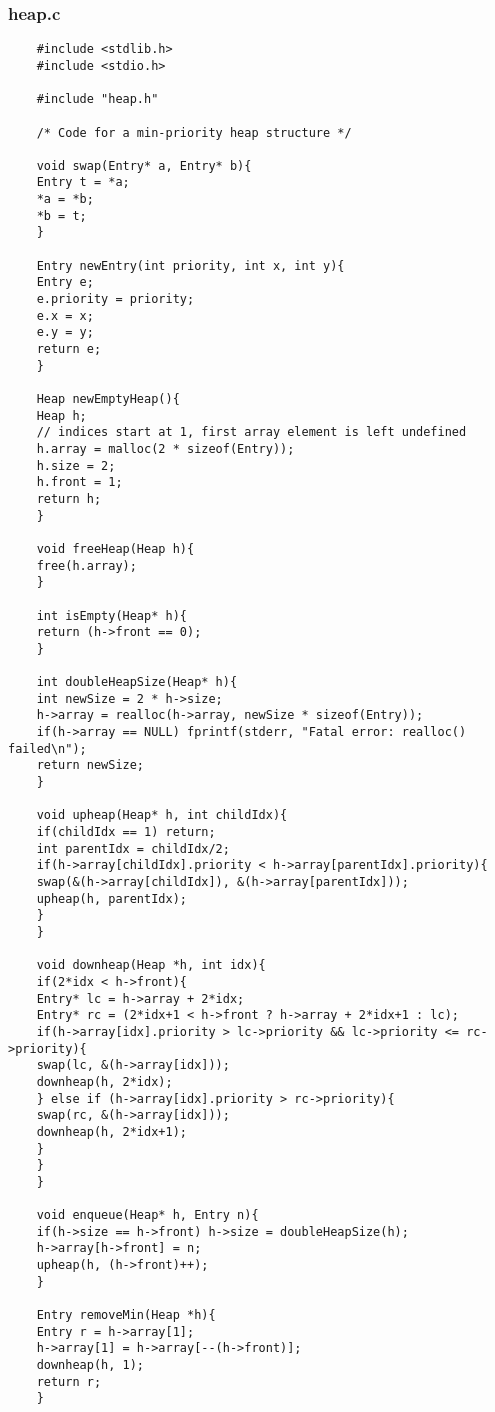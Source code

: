 \documentclass{article}
\begin{document}
	\subsubsection*{heap.c}
	\begin{lstlisting}
	#include <stdlib.h>
	#include <stdio.h>
	
	#include "heap.h"
	
	/* Code for a min-priority heap structure */
	
	void swap(Entry* a, Entry* b){
	Entry t = *a;
	*a = *b;
	*b = t;
	}
	
	Entry newEntry(int priority, int x, int y){
	Entry e;
	e.priority = priority;
	e.x = x;
	e.y = y;
	return e;
	}
	
	Heap newEmptyHeap(){
	Heap h;
	// indices start at 1, first array element is left undefined
	h.array = malloc(2 * sizeof(Entry));
	h.size = 2;
	h.front = 1;
	return h;
	}
	
	void freeHeap(Heap h){
	free(h.array);
	}
	
	int isEmpty(Heap* h){
	return (h->front == 0);
	}
	
	int doubleHeapSize(Heap* h){
	int newSize = 2 * h->size;
	h->array = realloc(h->array, newSize * sizeof(Entry));
	if(h->array == NULL) fprintf(stderr, "Fatal error: realloc() failed\n");
	return newSize;
	}
	
	void upheap(Heap* h, int childIdx){
	if(childIdx == 1) return;
	int parentIdx = childIdx/2;
	if(h->array[childIdx].priority < h->array[parentIdx].priority){
	swap(&(h->array[childIdx]), &(h->array[parentIdx]));
	upheap(h, parentIdx);
	}
	}
	
	void downheap(Heap *h, int idx){
	if(2*idx < h->front){
	Entry* lc = h->array + 2*idx;
	Entry* rc = (2*idx+1 < h->front ? h->array + 2*idx+1 : lc);
	if(h->array[idx].priority > lc->priority && lc->priority <= rc->priority){
	swap(lc, &(h->array[idx]));
	downheap(h, 2*idx);
	} else if (h->array[idx].priority > rc->priority){
	swap(rc, &(h->array[idx]));
	downheap(h, 2*idx+1);
	}
	}
	}
	
	void enqueue(Heap* h, Entry n){
	if(h->size == h->front) h->size = doubleHeapSize(h);
	h->array[h->front] = n;
	upheap(h, (h->front)++);
	}
	
	Entry removeMin(Heap *h){
	Entry r = h->array[1];
	h->array[1] = h->array[--(h->front)];
	downheap(h, 1);
	return r;
	}
	\end{lstlisting}
	
\end{document}
